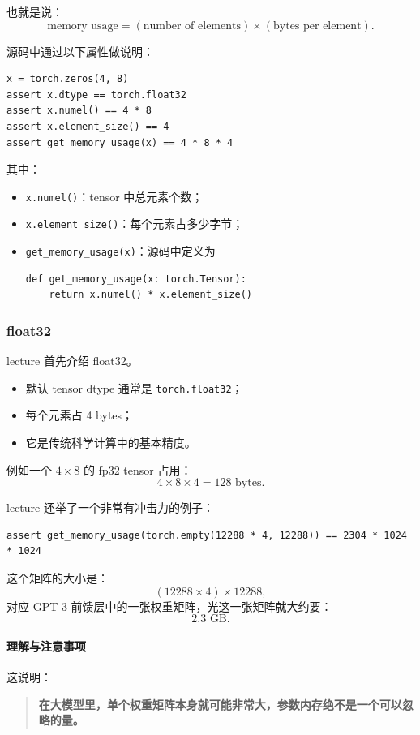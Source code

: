 \documentclass[a4paper,UTF8]{article}
\numberwithin{equation}{section}
\begin{document}
也就是说：
\[
\text{memory usage}
=
(\text{number of elements})
\times
(\text{bytes per element}).
\]

源码中通过以下属性做说明：
\begin{verbatim}
x = torch.zeros(4, 8)
assert x.dtype == torch.float32
assert x.numel() == 4 * 8
assert x.element_size() == 4
assert get_memory_usage(x) == 4 * 8 * 4
\end{verbatim}

其中：
\begin{itemize}
    \item \verb|x.numel()|：tensor 中总元素个数；
    \item \verb|x.element_size()|：每个元素占多少字节；
    \item \verb|get_memory_usage(x)|：源码中定义为
\begin{verbatim}
def get_memory_usage(x: torch.Tensor):
    return x.numel() * x.element_size()
\end{verbatim}
\end{itemize}

\subsubsection{float32}

lecture 首先介绍 float32。
\begin{itemize}
    \item 默认 tensor dtype 通常是 \verb|torch.float32|；
    \item 每个元素占 4 bytes；
    \item 它是传统科学计算中的基本精度。
\end{itemize}

例如一个 \(4 \times 8\) 的 fp32 tensor 占用：
\[
4 \times 8 \times 4 = 128 \text{ bytes}.
\]

lecture 还举了一个非常有冲击力的例子：
\begin{verbatim}
assert get_memory_usage(torch.empty(12288 * 4, 12288)) == 2304 * 1024 * 1024
\end{verbatim}

这个矩阵的大小是：
\[
(12288 \times 4) \times 12288,
\]
对应 GPT-3 前馈层中的一张权重矩阵，光这一张矩阵就大约要：
\[
2.3 \text{ GB}.
\]

\paragraph{理解与注意事项}
这说明：
\begin{quote}
\textbf{在大模型里，单个权重矩阵本身就可能非常大，参数内存绝不是一个可以忽略的量。}
\end{quote}
\end{document}
